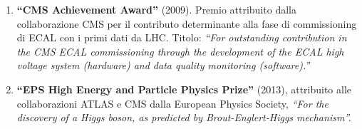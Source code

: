 \documentclass[11pt,twoside,a4paper]{article}
\begin{document}
\begin{enumerate}
\item \textbf{``CMS Achievement Award''} (2009). Premio attribuito dalla
  collaborazione CMS per il contributo determinante alla fase di
  commissioning di ECAL con i primi dati da LHC. Titolo: \textit{``For
  outstanding contribution in the CMS ECAL commissioning through the
  development of the ECAL high voltage system (hardware) and data
  quality monitoring (software).''}

\item \textbf{``EPS High Energy and Particle Physics Prize''} (2013),
  attribuito alle collaborazioni ATLAS e CMS dalla European Physics
  Society, \textit{``For the discovery of a Higgs boson, as predicted by
  Brout-Englert-Higgs mechanism''.}
\end{enumerate}
\end{document}
